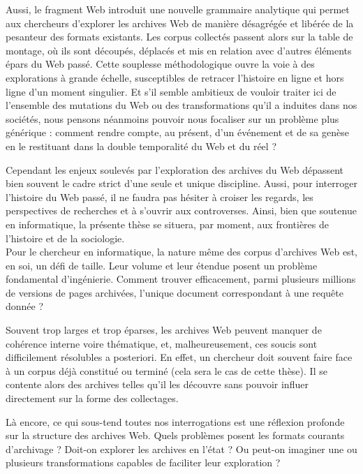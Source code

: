 \documentclass[symmetric,justified,marginals=raggedouter]{tufte-book}
\begin{document}
Aussi, le fragment Web introduit une nouvelle grammaire analytique qui permet aux chercheurs d'explorer les archives Web de manière désagrégée et libérée de la pesanteur des formats existants. Les corpus collectés passent alors sur la table de montage, où ils sont découpés, déplacés et mis en relation avec d'autres éléments épars du Web passé. Cette souplesse méthodologique ouvre la voie à des explorations à grande échelle, susceptibles de retracer l'histoire en ligne et hors ligne d'un moment singulier. Et s'il semble ambitieux de vouloir traiter ici de l'ensemble des mutations du Web ou des transformations qu'il a induites dans nos sociétés, nous pensons néanmoins pouvoir nous focaliser sur un problème plus générique : comment rendre compte, au présent, d'un événement et de sa genèse en le restituant dans la double temporalité du Web et du réel ?

Cependant les enjeux soulevés par l'exploration des archives du Web dépassent bien souvent le cadre strict d'une seule et unique discipline. Aussi, pour interroger l'histoire du Web passé, il ne faudra pas hésiter à croiser les regards, les perspectives de recherches et à s'ouvrir aux controverses. Ainsi, bien que soutenue en informatique, la présente thèse se situera, par moment, aux frontières de l'histoire et de la sociologie.\\

\noindent Pour le chercheur en informatique, la nature même des corpus d'archives Web est, en soi, un défi de taille. Leur volume et leur étendue posent un problème fondamental d'ingénierie. Comment trouver efficacement, parmi plusieurs millions de versions de pages archivées, l'unique document correspondant à une requête donnée ? 

Souvent trop larges et trop éparses, les archives Web peuvent manquer de cohérence interne voire thématique, et, malheureusement, ces soucis sont difficilement résolubles a posteriori. En effet, un chercheur doit souvent faire face à un corpus déjà constitué ou terminé (cela sera le cas de cette thèse). Il se contente alors des archives telles qu'il les découvre sans pouvoir influer directement sur la forme des collectages. 

Là encore, ce qui sous-tend toutes nos interrogations est une réflexion profonde sur la structure des archives Web. Quels problèmes posent les formats courants d'archivage ? Doit-on explorer les archives en l'état ? Ou peut-on imaginer une ou plusieurs transformations capables de faciliter leur exploration ?\\
\end{document}
